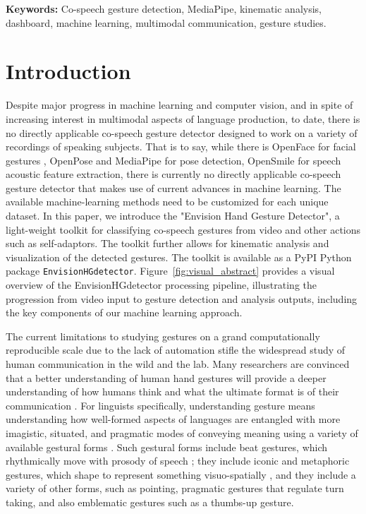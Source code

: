 \documentclass[11pt,headings=small,cleardoublepage=empty,tocflat,numbers=noenddot,twoside,captions=tableheading]{scrbook}
\begin{document}
\begin{refsection}
\textbf{Keywords:} Co-speech gesture detection, MediaPipe, kinematic analysis, dashboard, machine learning, multimodal communication, gesture studies.

\section{Introduction}
Despite major progress in machine learning and computer vision, and in spite of increasing interest in multimodal aspects of language production, to date, there is no directly applicable co-speech gesture detector designed to work on a variety of recordings of speaking subjects. That is to say, while there is OpenFace for facial gestures \parencite{baltrusaitisOpenFaceOpenSource2016}, OpenPose \parencite{caoOpenPoseRealtimeMultiPerson2021} and MediaPipe \parencite{caoOpenPoseRealtimeMultiPerson2021} for pose detection, OpenSmile \parencite{eybenOpensmileMunichVersatile2010} for speech acoustic feature extraction, there is currently no directly applicable co-speech gesture detector that makes use of current advances in machine learning. The available machine-learning methods need to be customized for each unique dataset. In this paper, we introduce the "Envision Hand Gesture Detector", a light-weight toolkit for classifying co-speech gestures from video and other actions such as self-adaptors. The toolkit further allows for kinematic analysis and visualization of the detected gestures. The toolkit is available as a PyPI Python package \texttt{EnvisionHGdetector}. Figure~\ref{fig:visual_abstract} provides a visual overview of the EnvisionHGdetector processing pipeline, illustrating the progression from video input to gesture detection and analysis outputs, including the key components of our machine learning approach.

The current limitations to studying gestures on a grand computationally reproducible scale due to the lack of automation stifle the widespread study of human communication in the wild and the lab. Many researchers are convinced that a better understanding of human hand gestures will provide a deeper understanding of how humans think and what the ultimate format is of their communication \parencite{feyereisenCognitivePsychologySpeechrelated2017, kendonGestureVisibleAction2004,mcneillHandMindWhat1992, goldin-meadowGestureSignLanguage2017, mcneillHandMindWhat1992}. For linguists specifically, understanding gesture means understanding how well-formed aspects of languages are entangled with more imagistic, situated, and pragmatic modes of conveying meaning using a variety of available gestural forms \parencite{alviarMultimodalCoordinationPragmatic2023, murgianoSituatingLanguageRealworld2021}. Such gestural forms include beat gestures, which rhythmically move with prosody of speech \parencite{wagnerGestureSpeechInteraction2014}; they include iconic and metaphoric gestures, which shape to represent something visuo-spatially \parencite{streeckDepictingGesture2008}, and they include a variety of other forms, such as pointing, pragmatic gestures that regulate turn taking, and also emblematic gestures such as a thumbs-up gesture.


\end{refsection}
\end{document}
